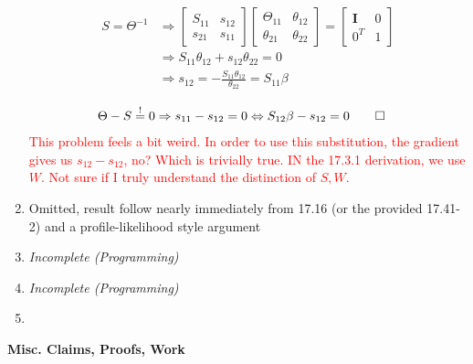 \documentclass[11pt]{article}
\begin{document}
\begin{enumerate}
    \begin{align*}
    S 
    = 
    \Theta^{-1}
    &\Rightarrow 
    \begin{bmatrix}
        S_{11} & s_{12} \\ 
        s_{21} & s_{11}
    \end{bmatrix}
        \begin{bmatrix}
        \Theta_{11} & \theta_{12} \\ 
        \theta_{21} & \theta_{22}
    \end{bmatrix}
    =
    \begin{bmatrix}
        \mathbf{I} & 0 \\ 
        0^T & 1
    \end{bmatrix}
    \\
    &\Rightarrow 
    S_{11}\theta_{12} + s_{12}\theta_{22} = 0
    \\
    &\Rightarrow 
    s_{12} 
    = 
    -\frac{
    S_{11}\theta_{12}
    }{
    \theta_{22}
    }
    =
    S_{11}\beta 
    \end{align*}
    
    \begin{align*}
        \Theta - S \stackrel{!}{=}0
        &\Rightarrow
        s_{11} - s_{12} = 0
        \Leftrightarrow 
        S_{12}\beta - s_{12} = 0 \qed 
    \end{align*}
    \textcolor{red}{This problem feels a bit weird. In order to use this substitution, the gradient gives us $s_{12} - s_{12}$, no? Which is trivially true. IN the 17.3.1 derivation, we use $W$. Not sure if I truly understand the distinction of $S, W$. }

    \item Omitted, result follow nearly immediately from 17.16 (or the provided 17.41-2) and a profile-likelihood style argument

    \item {\it Incomplete (Programming)} 

    \item {\it Incomplete (Programming)}

    \item 
\end{enumerate}


\newpage 

\begin{tcolorbox}
    \vspace{4mm}
    \Large \bf Misc. Claims, Proofs, Work
    \vspace{4mm}
\end{tcolorbox}
\end{document}
